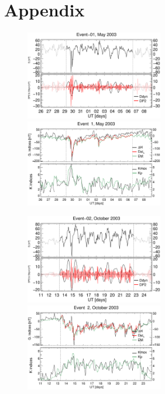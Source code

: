 \documentclass[a4paper,fleqn]{cas-dc}
\begin{document}
\section{Appendix}
\label{apend}
\begin{figure}[h!]
    \centering
    \centerline{\Large \bf   
         \hfill}
          \centerline{\Large \bf   
      \hspace{0.26\textwidth}  \color{black}{}
       \hspace{0.31\textwidth}  \color{black}{}
         \hfill}
     \includegraphics[width=6.0cm]{images/diono/iono_PI_V1_2003-05-26.eps}
	\includegraphics[width=6.0cm]{images/dH_approx/diono_valid_V4_2003-05-26.eps}
     \centerline{\Large \bf   
      \hspace{0.275\textwidth}  \color{black}{}
       \hspace{0.295\textwidth}  \color{black}{}
         \hfill}
     \includegraphics[width=6.0cm]{images/diono/iono_PI_V1_2003-10-11.eps}
   	 \includegraphics[width=6.0cm]{images/dH_approx/diono_valid_V4_2003-10-11.eps}

\end{figure}
\end{document}
